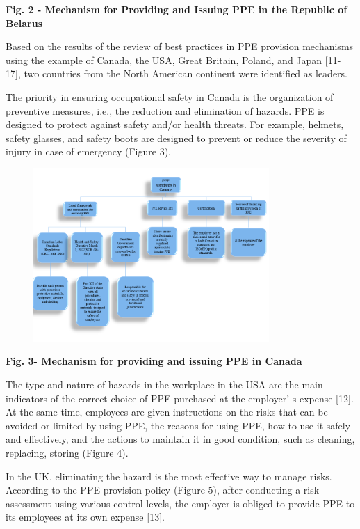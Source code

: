{{\bfseries Fig. 2 - Mechanism for Providing and Issuing PPE in the Republic
of Belarus}

Based on the results of the review of best practices in PPE provision
mechanisms using the example of Canada, the USA, Great Britain, Poland,
and Japan {[}11-17{]}, two countries from the North American continent
were identified as leaders.

The priority in ensuring occupational safety in Canada is the
organization of preventive measures, i.e., the reduction and elimination
of hazards. PPE is designed to protect against safety and/or health
threats. For example, helmets, safety glasses, and safety boots are
designed to prevent or reduce the severity of injury in case of
emergency (Figure 3).

\begin{figure}[H]
	\centering
	\includegraphics[width=0.8\textwidth]{media/chem2/image4}
	\caption*{}
\end{figure}


{\bfseries Fig. 3- Mechanism for providing and issuing PPE in Canada}

The type and nature of hazards in the workplace in the USA are the main
indicators of the correct choice of PPE purchased at the
employer' s expense {[}12{]}. At the same time, employees
are given instructions on the risks that can be avoided or limited by
using PPE, the reasons for using PPE, how to use it safely and
effectively, and the actions to maintain it in good condition, such as
cleaning, replacing, storing (Figure 4).

In the UK, eliminating the hazard is the most effective way to manage
risks. According to the PPE provision policy (Figure 5), after
conducting a risk assessment using various control levels, the employer
is obliged to provide PPE to its employees at its own expense {[}13{]}.

}
